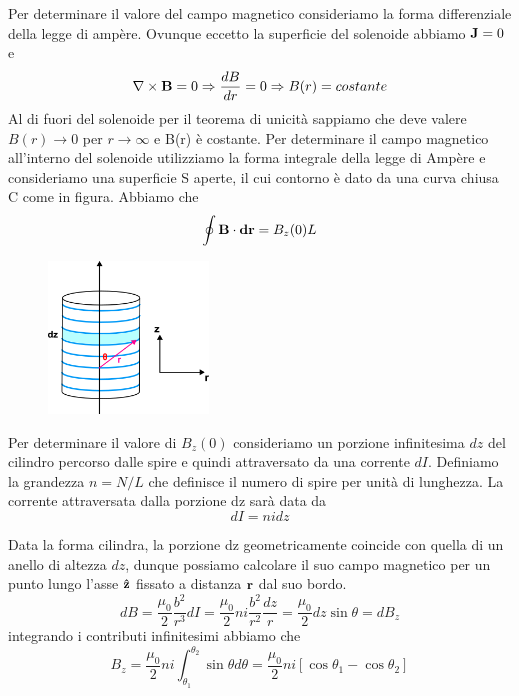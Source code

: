 Per determinare il valore del campo magnetico consideriamo la forma differenziale della legge di amp\`ere. Ovunque eccetto la superficie del solenoide abbiamo $\bold{J} =0$ e 
	\begin{equation*}
		\nabla \times \bold{B} = 0 \Rightarrow \frac{dB}{dr} = 0 \Rightarrow B(r) = costante
	\end{equation*} 
Al di fuori del solenoide per il teorema di unicit\`a sappiamo che deve valere $B(r) \to 0$ per $r \to \infty $ e B(r) \`e costante. Per determinare il campo magnetico all'interno del solenoide utilizziamo la forma integrale della legge di Amp\`ere e consideriamo una superficie S aperte, il cui contorno \`e dato da una curva chiusa C come in figura. Abbiamo che 
\begin{equation}
	\oint \bold{B} \cdot \bold{dr} = B_z(0)L
\end{equation} 
\begin{figure} %
    \centering
    \includegraphics[width=0.38\textwidth]{images/solenoiddensity}
\end{figure}

Per determinare il valore di $B_z(0)$ consideriamo un porzione infinitesima $dz$ del cilindro percorso dalle spire e quindi attraversato da una corrente $dI$. Definiamo la grandezza $n = N/ L$ che definisce il numero di spire per unit\`a di lunghezza. La corrente attraversata dalla porzione dz sar\`a data da 
\begin{equation*}
	dI = nidz
\end{equation*}

Data la forma cilindra, la porzione dz geometricamente coincide con quella di un anello di altezza $dz$, dunque possiamo calcolare il suo campo magnetico per un punto lungo l'asse $\bold{\hat{z}}$ fissato a distanza $\bold{r}$ dal suo bordo.
\begin{equation*}
	dB = \frac{\mu_0}{2}\frac{b^2}{r^3}dI = \frac{\mu_0}{2}ni \frac{b^2}{r^2}\frac{dz}{r} = \frac{\mu_0}{2}dz\sin\theta = dB_z
\end{equation*}
integrando i contributi infinitesimi abbiamo che 
\begin{equation*}
	B_z =  \frac{\mu_0}{2}ni \int_{\theta_1}^{\theta_2}\sin \theta d\theta = \frac{\mu_0}{2}ni[\cos\theta_1-\cos\theta_2]
\end{equation*}

